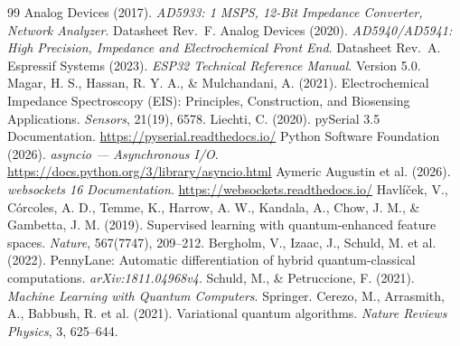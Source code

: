 \documentclass[11pt,a4paper,spanish]{book}
\begin{document}
\begin{thebibliography}{99}
 Analog Devices (2017). \emph{AD5933: 1 MSPS, 12-Bit Impedance Converter, Network Analyzer}. Datasheet Rev.~F.
 Analog Devices (2020). \emph{AD5940/AD5941: High Precision, Impedance and Electrochemical Front End}. Datasheet Rev.~A.
 Espressif Systems (2023). \emph{ESP32 Technical Reference Manual}. Version 5.0.
 Magar, H. S., Hassan, R. Y. A., \& Mulchandani, A. (2021). Electrochemical Impedance Spectroscopy (EIS): Principles, Construction, and Biosensing Applications. \emph{Sensors}, 21(19), 6578.
 Liechti, C. (2020). pySerial 3.5 Documentation. \url{https://pyserial.readthedocs.io/}
 Python Software Foundation (2026). \emph{asyncio --- Asynchronous I/O}. \url{https://docs.python.org/3/library/asyncio.html}
 Aymeric Augustin et al. (2026). \emph{websockets 16 Documentation}. \url{https://websockets.readthedocs.io/}
 Havl\'{i}\v{c}ek, V., C\'{o}rcoles, A. D., Temme, K., Harrow, A. W., Kandala, A., Chow, J. M., \& Gambetta, J. M. (2019). Supervised learning with quantum-enhanced feature spaces. \emph{Nature}, 567(7747), 209--212.
 Bergholm, V., Izaac, J., Schuld, M. et al. (2022). PennyLane: Automatic differentiation of hybrid quantum-classical computations. \emph{arXiv:1811.04968v4}.
 Schuld, M., \& Petruccione, F. (2021). \emph{Machine Learning with Quantum Computers}. Springer.
 Cerezo, M., Arrasmith, A., Babbush, R. et al. (2021). Variational quantum algorithms. \emph{Nature Reviews Physics}, 3, 625--644.
\end{thebibliography}
\end{document}
